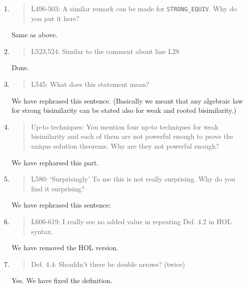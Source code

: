 \begin{enumerate}
\item \begin{quote}
    L496-503: A similar remark can be made for \texttt{STRONG\_EQUIV}. Why do you put it here?
  \end{quote}
  Same as above.

\item \begin{quote}
    L523,524: Similar to the comment about line L28
  \end{quote}
  Done.
  
\item \begin{quote}
    L545: What does this statement mean?
  \end{quote}
  We have rephrased this sentence. (Basically we meant that
any  algebraic law for strong bisimilarity can be stated also for
  weak and rooted bisimilarity.)

\item \begin{quote}
    Up-to techniques: You mention four up-to techniques for weak
    bisimilarity and each of them are not powerful enough to prove the
    unique solution theorems. Why are they not powerful enough?
  \end{quote}

  We have repharsed this part.
  
\item \begin{quote}
    L580: ‘Surprisingly’ To me this is not really surprising. Why do you find it surprising?
  \end{quote}
 We have rephrased this sentence:




\item \begin{quote}
    L606-619: I really see no added value in repeating Def. 4.2 in HOL syntax.
  \end{quote}
  We have removed the HOL version.
  
\item \begin{quote}
    Def. 4.4: Shouldn’t there be double arrows? (twice)
  \end{quote}
  Yes. We have fixed the definition.
  

\end{enumerate}
